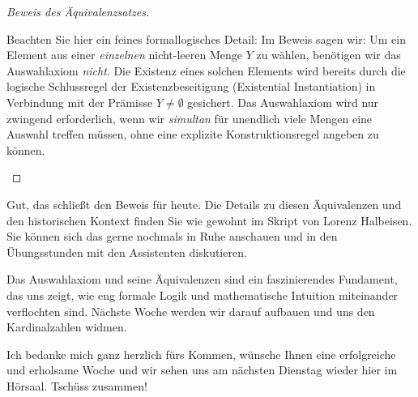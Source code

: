 \begin{proof}[Beweis des Äquivalenzsatzes]
\begin{didactic-insight}
Beachten Sie hier ein feines formallogisches Detail: Im Beweis sagen wir:  Um ein Element aus einer \emph{einzelnen} nicht-leeren Menge $Y$ zu wählen, benötigen wir das Auswahlaxiom \emph{nicht}. Die Existenz eines solchen Elements wird bereits durch die logische Schlussregel der Existenzbeseitigung (Existential Instantiation) in Verbindung mit der Prämisse $Y \neq \emptyset$ gesichert. Das Auswahlaxiom wird nur zwingend erforderlich, wenn wir \emph{simultan} für unendlich viele Mengen eine Auswahl treffen müssen, ohne eine explizite Konstruktionsregel angeben zu können.
\end{didactic-insight}
\end{proof}

\begin{spoken-clean}[01:28:40 - 01:29:21]
Gut, das schließt den Beweis für heute. Die Details zu diesen Äquivalenzen und den historischen Kontext finden Sie wie gewohnt im Skript von Lorenz Halbeisen. Sie können sich das gerne nochmals in Ruhe anschauen und in den Übungsstunden mit den Assistenten diskutieren.

Das Auswahlaxiom und seine Äquivalenzen sind ein faszinierendes Fundament, das uns zeigt, wie eng formale Logik und mathematische Intuition miteinander verflochten sind. Nächste Woche werden wir darauf aufbauen und uns den Kardinalzahlen widmen.

Ich bedanke mich ganz herzlich fürs Kommen, wünsche Ihnen eine erfolgreiche und erholsame Woche und wir sehen uns am nächsten Dienstag wieder hier im Hörsaal. Tschüss zusammen!
\end{spoken-clean}

